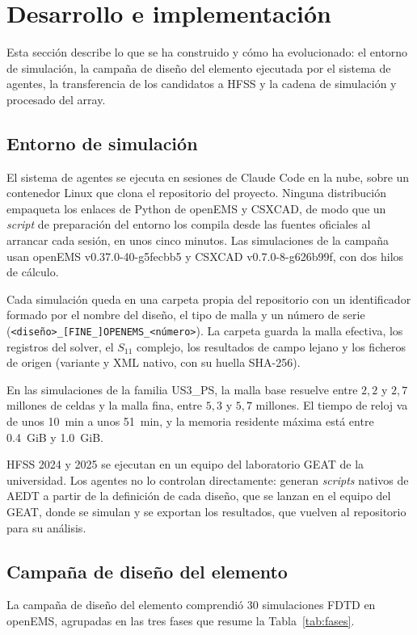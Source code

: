\documentclass[11pt,a4paper]{article}
\begin{document}
\section{Desarrollo e implementación}\label{sec:desarrollo}
Esta sección describe lo que se ha construido y cómo ha evolucionado: el entorno de simulación, la
campaña de diseño del elemento ejecutada por el sistema de agentes, la transferencia de los
candidatos a HFSS y la cadena de simulación y procesado del array.

\subsection{Entorno de simulación}\label{sec:entorno}
El sistema de agentes se ejecuta en sesiones de Claude Code en la nube, sobre un contenedor Linux
que clona el repositorio del proyecto. Ninguna distribución empaqueta los enlaces de Python de
openEMS y CSXCAD, de modo que un \textit{script} de preparación del entorno los compila desde las
fuentes oficiales al arrancar cada sesión, en unos cinco minutos. Las simulaciones de la campaña
usan openEMS v0.37.0-40-g5fecbb5 y CSXCAD v0.7.0-8-g626b99f,
con dos hilos de cálculo.

Cada simulación queda en una carpeta propia del repositorio con un identificador formado por el nombre del diseño, el tipo de malla y un número de serie (\texttt{<diseño>\_[FINE\_]OPENEMS\_<número>}). La carpeta guarda la malla efectiva, los registros del solver, el $S_{11}$ complejo, los resultados de campo lejano y los ficheros de origen (variante y XML nativo, con su huella SHA-256).

En las simulaciones de la familia US3\_PS, la malla base resuelve entre $2{,}2$ y $2{,}7$ millones de celdas
y la malla fina, entre $5{,}3$ y $5{,}7$ millones. El tiempo de reloj va de unos \SI{10}{min} a unos \SI{51}{min}, y la
memoria residente máxima está entre \SI{0.4}{GiB} y \SI{1.0}{GiB}.

HFSS 2024 y 2025 se ejecutan en un equipo del laboratorio GEAT de la universidad. Los agentes no lo controlan directamente: generan
\textit{scripts} nativos de AEDT a partir de la definición de cada diseño, que se lanzan en el equipo del GEAT,
donde se simulan y se exportan los resultados, que vuelven al repositorio para su análisis.

\subsection{Campaña de diseño del elemento}\label{sec:campana}
La campaña de diseño del elemento comprendió 30 simulaciones FDTD en openEMS, agrupadas en las tres
fases que resume la Tabla~\ref{tab:fases}.
\end{document}
